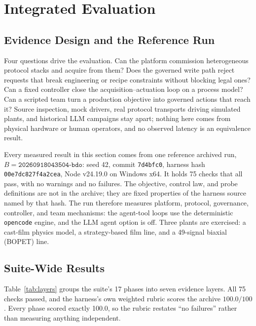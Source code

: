 \section{Integrated Evaluation}
\label{sec:eval}

\subsection{Evidence Design and the Reference Run}
\label{sec:protocol}
\label{sec:static}
Four questions drive the evaluation. Can the platform commission heterogeneous
protocol stacks and acquire from them? Does the governed write path reject requests
that break engineering or recipe constraints without blocking legal ones? Can a
fixed controller close the acquisition--actuation loop on a process model? Can a
scripted team turn a production objective into governed actions that reach it?
Source
inspection, mock drivers, real protocol transports driving simulated plants, and
historical LLM campaigns stay apart; nothing here comes from physical hardware or
human operators, and no observed latency is an equivalence result.

Every measured result in this section comes from one reference archived run,
$B=\texttt{20260918043504-bdo}$: seed 42, commit \texttt{7d4bfc0}, harness hash
\texttt{00e7dc827f4a2cea}, Node v24.19.0 on Windows x64. It holds 75 checks that all
pass, with no warnings and no failures. The objective, control law, and probe
definitions are not in the archive; they are fixed properties of the harness source
named by that hash. The run therefore measures platform, protocol, governance,
controller, and team mechanisms: the agent-tool loops use the deterministic
\texttt{opencode} engine, and the LLM agent option is off. Three plants are exercised: a
cast-film physics model, a strategy-based film line, and a 49-signal biaxial (BOPET)
line.

\subsection{Suite-Wide Results}
\label{sec:suite}
Table~\ref{tab:layers} groups the suite's 17 phases into seven evidence layers.
All 75 checks passed, and the harness's own weighted rubric scores the archive
$100.0/100$. Every phase scored exactly 100.0, so the rubric restates ``no
failures'' rather than measuring anything independent.

